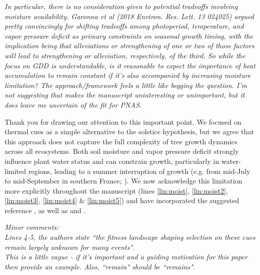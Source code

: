 \documentclass[11pt,letter]{article}
\begin{document}
\begin{mybox}
\emph{In particular, there is no consideration given to potential tradeoffs involving moisture availability. Garonna et al (2018 Environ. Res. Lett. 13 024025) argued pretty convincingly for shifting tradeoffs among photoperiod, temperature, and vapor pressure deficit as primary constraints on seasonal growth timing, with the implication being that alleviations or strengthening of one or two of those factors will lead to strengthening or alleviation, respectively, of the third. So while the focus on GDD is understandable, is it reasonable to expect the importance of heat accumulation to remain constant if it's also accompanied by increasing moisture limitation? The approach/framework feels a little like begging the question. I'm not suggesting that makes the manuscript uninteresting or unimportant, but it does leave me uncertain of the fit for PNAS.}
\end{mybox}

Thank you for drawing our attention to this important point. 
We focused on thermal cues as a simple alternative to the solstice hypothesis, but we agree that this approach does not capture the full complexity of tree growth dynamics across all ecosystems. Both soil moisture and vapor pressure deficit strongly influence plant water status and can constrain growth, particularly in water-limited regions, leading to a summer interruption of growth (e.g. from mid-July to mid-September in southern France; \citealt{Lempereur2015}). We now acknowledge this limitation more explicitly throughout the manuscript (lines \href{file:synchrony_r1\#lintarget:moist}{\ref*{lin:moist}}, \href{file:synchrony_r1\#lintarget:moist2}{\ref*{lin:moist2}}, \href{file:synchrony_r1\#lintarget:moist3}{\ref*{lin:moist3}}, \href{file:synchrony_r1\#lintarget:moist4}{\ref*{lin:moist4}} \& \href{file:synchrony_r1\#lintarget:moist5}{\ref*{lin:moist5}}) and have incorporated the suggested reference \citep{Garonna2018}, as well as \citet{Zhao2010} and \citet{Seo2025}.\\

\begin{mybox}
\emph{Minor comments:\\
Lines 4-5, the authors state ``the fitness landscape shaping selection on these cues remain largely unknown for many events".\\
This is a little vague - if it's important and a guiding motivation for this paper then provide an example. Also, ``remain" should be ``remains".}
\end{mybox}
\end{document}
